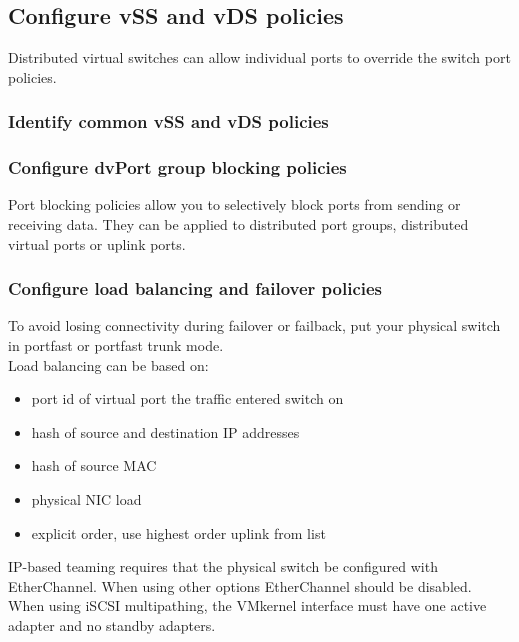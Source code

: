 \subsection{Configure vSS and vDS policies}

Distributed virtual switches can allow individual ports to override the switch
port policies.

\subsubsection{Identify common vSS and vDS policies}

\subsubsection{Configure dvPort group blocking policies}

Port blocking policies allow you to selectively block ports from sending or
receiving data. They can be applied to distributed port groups, distributed
virtual ports or uplink ports.

\subsubsection{Configure load balancing and failover policies}

To avoid losing connectivity during failover or failback, put your physical
switch in portfast or portfast trunk mode.\\

Load balancing can be based on:

\begin{itemize}
\item port id of virtual port the traffic entered switch on
\item hash of source and destination IP addresses
\item hash of source MAC
\item physical NIC load
\item explicit order, use highest order uplink from list
\end{itemize}

IP-based teaming requires that the physical switch be configured with
EtherChannel. When using other options EtherChannel should be disabled.\\

When using iSCSI multipathing, the VMkernel interface must have one active
adapter and no standby adapters.\\

